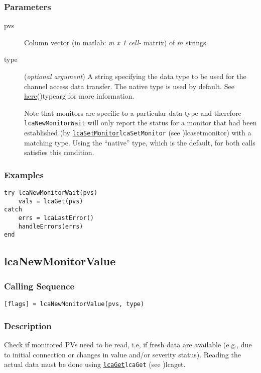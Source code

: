 \documentclass{article}
\newcommand{\com}[1]{{\tt #1}}
\newcommand{\pbrk}{\pagebreak[3]}
\newcommand{\comref}[2]{\hyperref[ref]{\com{#1}}{\com{#1} (see }{)}{#2}}
\newcommand{\ita}[1]{\emph{#1}}
\newcommand{\m}{$m$}
\newcommand{\mhack}{$m$} %
\newcommand{\mxl}{$m\times 1$}
\renewcommand{\m}{\ita{m}}
\newcommand{\mhack}{\ita{m}} %
\renewcommand{\mxl}{\ita{m x 1}}
\renewcommand{\pbrk}{}
\newcommand{\PVITEM}{
\item[pvs] Column vector (in matlab: \mxl{} \ita{cell-} matrix)
of \mhack{} strings.
}
\begin{document}
\subsubsection{Parameters}
\begin{description}
\PVITEM
\item[type]
(\ita{optional argument}) A string specifying the
data type to be used for the channel access data transfer. The
native type is used by default.
See \hyperref[ref]{here}{(}{)}{typearg} for more information.

Note that monitors are specific to a particular data type and therefore
\com{lcaNewMonitorWait} will only report the status for a monitor that had been established
(by \comref{lcaSetMonitor}{lcasetmonitor}) with a matching type.
Using the ``native'' type, which is the default, for both calls
satisfies this condition.
\end{description}
\subsubsection{Examples}
\begin{verbatim}
try lcaNewMonitorWait(pvs)
	vals = lcaGet(pvs)
catch
	errs = lcaLastError()
	handleErrors(errs)
end
\end{verbatim}

\pbrk
\subsection{lcaNewMonitorValue}
\label{lcanewmonitorvalue}
\subsubsection{Calling Sequence}
\begin{verbatim}
[flags] = lcaNewMonitorValue(pvs, type)
\end{verbatim}
\subsubsection{Description}
Check if monitored PVs need to be read, i.e, if fresh data are available (e.g., due to
initial connection or changes in value and/or severity status). Reading the actual
data must be done using \comref{lcaGet}{lcaget}.
\end{document}
